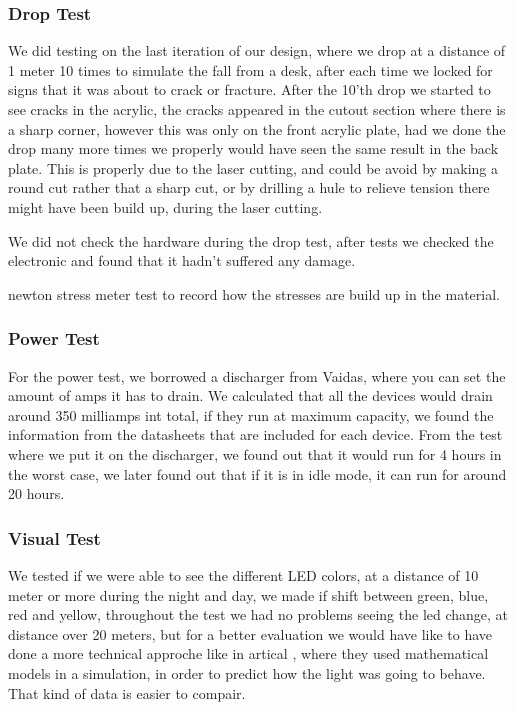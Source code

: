 \subsubsection{Drop Test}
We did testing on the last iteration of our design, where we drop at a distance of 1 meter 10 times to simulate the fall from a desk, after each time we locked for signs that it was about to crack or fracture.
After the 10'th drop we started to see cracks in the acrylic, the cracks appeared in the cutout section where there is a sharp corner, however this was only on the front acrylic plate, had we done the drop many more times we properly would have seen the same result in the back plate.
This is properly due to the laser cutting, and could be avoid by making a round cut rather that a sharp cut, or by drilling a hule to relieve tension there might have been build up, during the laser cutting.

We did not check the hardware during the drop test, after tests we checked the electronic and found that it hadn't suffered any damage.

newton stress meter test to record how the stresses are build up in the material.

\subsubsection{Power Test}
For the power test, we borrowed a discharger from Vaidas, where you can set the amount of amps it has to drain.
We calculated that all the devices would drain around 350 milliamps int total, if they run at maximum capacity, we found the information from the datasheets that are included for each device.
From the test where we put it on the discharger, we found out that it would run for 4 hours in the worst case, we later found out that if it is in idle mode, it can run for around 20 hours.

\subsubsection{Visual Test}
We tested if we were able to see the different LED colors, at a distance of 10 meter or more during the night and day, we made if shift between green, blue, red and yellow, throughout the test we had no problems seeing the led change, at distance over 20 meters, but for a better evaluation we would have like to have done a more technical approche like in artical \cite{LEDLIGHT}, where they used mathematical models in a simulation, in order to predict how the light was going to behave. That kind of data is easier to compair.

